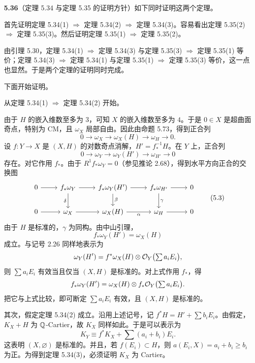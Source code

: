 
\par\medskip\noindent\textbf{5.36}（定理 5.34 与定理 5.35 的证明方针）\quad 如下同时证明这两个定理。

首先证明定理 5.34(1) $\Rightarrow$ 定理 5.34(2) $\Rightarrow$ 定理 5.34(3)。容易看出定理 5.35(2) $\Rightarrow$ 定理 5.35(3)。然后证明定理 5.35(1) $\Rightarrow$ 定理 5.35(2)。

由引理 5.30，定理 5.34(1) $\Rightarrow$ 定理 5.34(3) 与定理 5.35(3) $\Rightarrow$ 定理 5.35(1) 等价；定理 5.34(3) $\Rightarrow$ 定理 5.34(1) 与定理 5.35(1) $\Rightarrow$ 定理 5.35(3) 等价，这一点也显然。于是两个定理的证明同时完成。

下面开始证明。

从定理 5.34(1) $\Rightarrow$ 定理 5.34(2) 开始。

由于 $H$ 的嵌入维数至多为 $3$，可知 $X$ 的嵌入维数至多为 $4$。于是 $0\in X$ 是超曲面奇点，特别为 CM，且 $\omega_X$ 局部自由。因此由命题 5.73，得到正合列
\[
0\to\omega_X\to\omega_X(H)\to\omega_H\to0.
\]
设 $f\colon Y\to X$ 是 $(X,H)$ 的对数奇点消解，$H'=f^{-1}_*H$。在 $Y$ 上，正合列
\[
0\to\omega_Y\to\omega_Y(H')\to\omega_{H'}\to0
\]
存在。对它作用 $f_*$。由于 $R^1f_*\omega_Y=0$（参见推论 2.68），得到水平方向正合的交换图
\begin{equation}
\begin{tikzcd}
0 \arrow[r] & f_*\omega_Y \arrow[r] \arrow[d,"\delta"'] & f_*\omega_Y(H') \arrow[r] \arrow[d,"\beta"] & f_*\omega_{H'} \arrow[r] \arrow[d,"\gamma"] & 0\\
0 \arrow[r] & \omega_X \arrow[r] & \omega_X(H) \arrow[r,"\alpha"'] & \omega_H \arrow[r] & 0
\end{tikzcd}
\tag{5.3}
\end{equation}
由于 $H$ 是标准的，$\gamma$ 为同构。由中山引理，
\[
f_*\omega_Y(H')=\omega_X(H)
\]
成立。与记号 2.26 同样地表示为
\[
\omega_Y(H')=f^*\omega_X(H)\otimes\mathcal{O}_Y\bigl(\textstyle\sum a_iE_i\bigr),
\]
则 $\sum a_iE_i$ 有效当且仅当 $(X,H)$ 是标准的。对上式作用 $f_*$，得
\[
f_*\omega_Y(H')=\omega_X(H)\otimes f_*\mathcal{O}_Y\bigl(\textstyle\sum a_iE_i\bigr).
\]
把它与上式比较，即可断定 $\sum a_iE_i$ 有效，且 $(X,H)$ 是标准的。

其次，假定定理 5.34(2) 成立。沿用上述记号，记 $f^*H=H'+\sum b_iE_i$。由假定，$K_X+H$ 为 $\mathbb{Q}$-Cartier，故 $K_X$ 同样如此。于是可以表示为
\[
K_Y\equiv f^*K_X+\textstyle\sum (a_i+b_i)E_i.
\]
这表明 $(X,\varnothing)$ 是标准的。并且，若 $f(E_i)\subset H$，则 $a(E_i,X)=a_i+b_i\ge b_i$ 为正。为得到定理 5.34(3)，必须证明 $K_X$ 为 Cartier。


